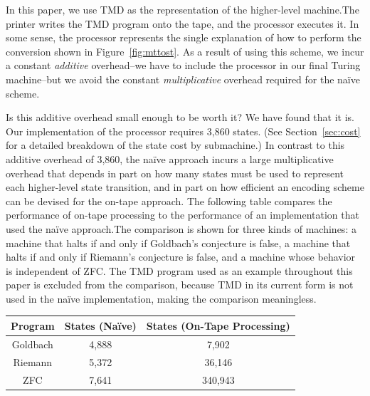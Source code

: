 \documentclass[11pt]{article}
\newcommand{\statenum}{7,641 }
\newcommand{\gbstatenum}{4,888 }
\newcommand{\rmstatenum}{5,372 }
\begin{document}
In this paper, we use TMD as the representation of the higher-level machine.\footnotemark The printer writes the TMD program onto the tape, and the processor executes it. In some sense, the processor represents the single explanation of how to perform the conversion shown in Figure~\ref{fig:mttost}. As a result of using this scheme, we incur a constant \emph{additive} overhead--we have to include the processor in our final Turing machine--but we avoid the constant \emph{multiplicative} overhead required for the na\"ive scheme. 

Is this additive overhead small enough to be worth it? We have found that it is. Our implementation of the processor requires 3,860 states. (See Section~\ref{sec:cost} for a detailed breakdown of the state cost by submachine.) In contrast to this additive overhead of 3,860, the na\"ive approach incurs a large multiplicative overhead that depends in part on how many states must be used to represent each higher-level state transition, and in part on how efficient an encoding scheme can be devised for the on-tape approach. The following table compares the performance of on-tape processing to the performance of an implementation that used the na\"ive approach.\footnotemark The comparison is shown for three kinds of machines: a machine that halts if and only if Goldbach's conjecture is false, a machine that halts if and only if Riemann's conjecture is false, and a machine whose behavior is independent of ZFC. The TMD program used as an example throughout this paper is excluded from the comparison, because TMD in its current form is not used in the na\"ive implementation, making the comparison meaningless.

\begin{center}
    \begin{tabular}{||c c c||}
    \hline
    Program & States (Na\"ive) & States (On-Tape Processing) \\ [0.5ex]
    \hline
    Goldbach & \gbstatenum & 7,902 \\
    \hline
    Riemann & \rmstatenum & 36,146 \\
    \hline 
    ZFC & \statenum & 340,943 \\
    \hline
    \end{tabular}
\end{center}
\end{document}
